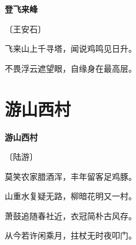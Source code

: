 \documentclass[12pt,UTF-8,openany,fontset=none]{ctexbook}
\begin{document}
\begin{center}
    {\bfseries 登飞来峰}

    \vspace{18pt}

    \begin{large}\xuwen
        〔王安石〕
    \end{large}

\end{center}

    \vspace{18pt}  %

\begin{center}
    \begin{Large}

        飞来山上千寻塔，闻说鸡鸣见日升。

        不畏浮云遮望眼，自缘身在最高层。

    \end{Large}

\end{center}

\vspace{8pt}
\clearpage

\section{游山西村}


\begin{center}
    {\bfseries 游山西村}

    \vspace{18pt}

    \begin{large}\xuwen
        〔陆游〕
    \end{large}

\end{center}

    \vspace{18pt}  %

\begin{center}
    \begin{Large}

        莫笑农家腊酒浑，丰年留客足鸡豚。

        山重水复疑无路，柳暗花明又一村。

        萧鼓追随春社近，衣冠简朴古风存。

        从今若许闲乘月，拄杖无时夜叩门。

    \end{Large}

\end{center}
\end{document}
